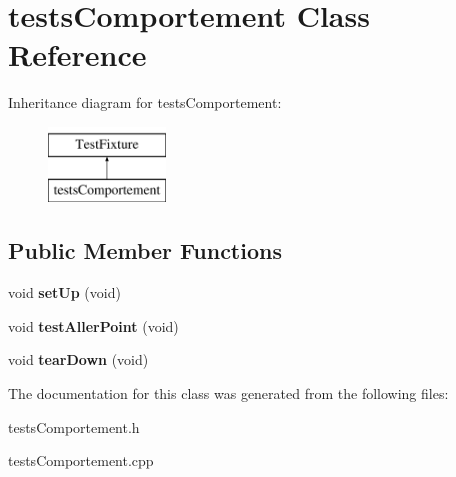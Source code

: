 \hypertarget{classtests_comportement}{}\section{tests\+Comportement Class Reference}
\label{classtests_comportement}
Inheritance diagram for tests\+Comportement\+:\begin{figure}[H]
\begin{center}
\leavevmode
\includegraphics[height=2.000000cm]{classtests_comportement}
\end{center}
\end{figure}
\subsection*{Public Member Functions}
\begin{DoxyCompactItemize}
\item 
\mbox{\label{classtests_comportement_a30de05f636cc85975d689062ee222f56}} 
void {\bfseries set\+Up} (void)
\item 
\mbox{\label{classtests_comportement_a212d4cd990a9b926974542784e6391ba}} 
void {\bfseries test\+Aller\+Point} (void)
\item 
\mbox{\label{classtests_comportement_a88b60fada2be682318345184a4b6c588}} 
void {\bfseries tear\+Down} (void)
\end{DoxyCompactItemize}


The documentation for this class was generated from the following files\+:\begin{DoxyCompactItemize}
\item 
tests\+Comportement.\+h\item 
tests\+Comportement.\+cpp\end{DoxyCompactItemize}
